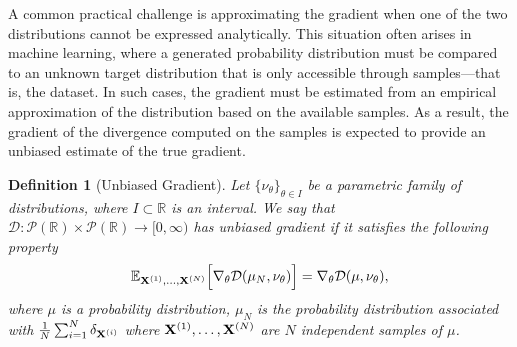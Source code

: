 \documentclass{article}
\renewcommand{\to}{\rightarrow}
\def\bX{{\bf X}}
\def \erre{\mathbb{R}}
\newtheorem{definition}{Definition}
\begin{document}
% 
% 

% 
% 

% 
A common practical challenge is approximating the gradient when one of the two distributions cannot be expressed analytically.
%
This situation often arises in machine learning, where a generated probability distribution must be compared to an unknown target distribution that is only accessible through samples—that is, the dataset.
%
In such cases, the gradient must be estimated from an empirical approximation of the distribution based on the available samples.
%
As a result, the gradient of the divergence computed on the samples is expected to provide an unbiased estimate of the true gradient.
% 

\begin{definition}[Unbiased Gradient]
    \label{def:unbiasedgrad}
    Let $\{\nu_\theta\}_{\theta\in I}$ be a parametric family of distributions, where $I\subset\erre$ is an interval.
    We say that $\mathcal{D}:\mathcal{P}(\erre)\times\mathcal{P}(\erre)\to[0,\infty)$ has unbiased gradient if it satisfies the following property
    \begin{equation}
    \label{eq:def:unbiasedgrad}
        \mathbb{E}_{\bX^{(1)},\dots,\bX^{(N)}}\Big[\nabla_{\theta}\mathcal{D}(\mu_N,\nu_\theta)\Big]=\nabla_{\theta}\mathcal{D}(\mu,\nu_\theta),
    \end{equation}
    where $\mu$ is a probability distribution, $\mu_N$ is the probability distribution associated with $\frac{1}{N}\sum_{i=1}^N\delta_{\bX^{(i)}}$ where $\bX^{(1)},\dots,\bX^{(N)}$ are $N$ independent samples of $\mu$.
\end{definition}

% 
% 
\end{document}
